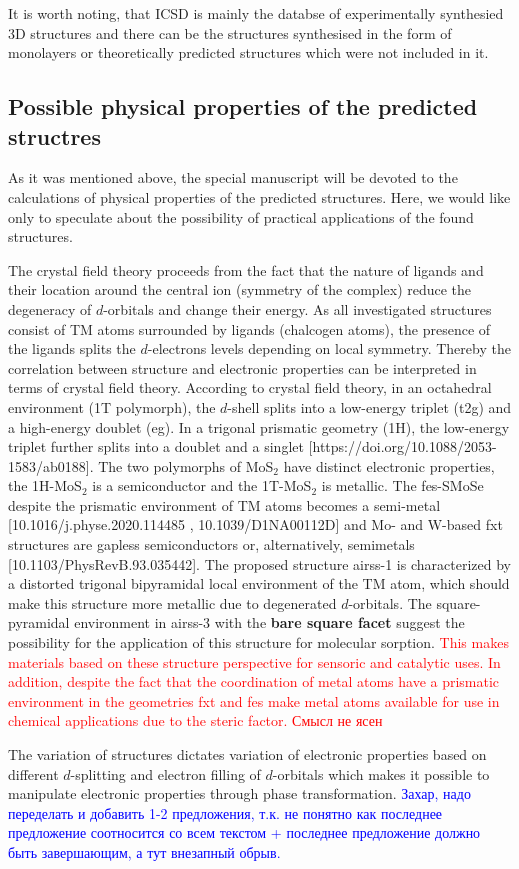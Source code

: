 \documentclass[a4paperm]{article}
\begin{document}
It is worth noting, that ICSD is mainly the databse of experimentally synthesied 3D structures and there can be the structures synthesised in the form of monolayers or theoretically predicted structures which were not included in it.



\subsection{Possible physical properties of the predicted structres}

As it was mentioned above, the special manuscript will be devoted to the calculations of physical properties of the predicted structures.
Here, we would like only to speculate about the possibility of practical applications of the found structures.

The crystal field theory proceeds from the fact that the nature of ligands and their location around the central ion (symmetry of the complex) reduce the degeneracy of $d$-orbitals and change their energy. As all investigated structures consist of TM atoms surrounded by ligands (chalcogen atoms), the presence of the ligands splits the $d$-electrons levels depending on local symmetry. Thereby the correlation between structure and electronic properties can be interpreted in terms of crystal field theory. According to crystal field theory, in an octahedral environment (1T polymorph), the $d$-shell splits into a low-energy triplet (t2g) and a high-energy doublet (eg). In a trigonal prismatic geometry (1H), the low-energy triplet further splits into a doublet and a singlet [https://doi.org/10.1088/2053-1583/ab0188]. The two polymorphs of MoS$_2$ have distinct electronic properties, the 1H-MoS$_2$ is a semiconductor and the 1T-MoS$_2$ is metallic. The fes-SMoSe despite the prismatic environment of TM atoms becomes a semi-metal [10.1016/j.physe.2020.114485 , 10.1039/D1NA00112D] and Mo- and W-based fxt structures are gapless semiconductors or, alternatively, semimetals [10.1103/PhysRevB.93.035442]. The proposed structure airss-1 is characterized by a distorted trigonal bipyramidal local environment of the TM atom, which should make this structure more metallic due to degenerated $d$-orbitals. The square-pyramidal environment in airss-3 with the {\bf bare square facet} suggest the possibility for the application of this structure for molecular sorption.
\textcolor{red}{This makes materials based on these structure perspective for sensoric and catalytic uses. In addition, despite the fact that the coordination of metal atoms have a prismatic environment in the geometries fxt and fes make metal atoms available for use in chemical applications due to the steric factor. Смысл не ясен}

The variation of structures dictates variation of electronic properties based on different $d$-splitting and electron filling of $d$-orbitals which makes it possible to manipulate electronic properties through phase transformation.
\textcolor{blue}{Захар, надо переделать и добавить 1-2 предложения, т.к. не понятно как последнее предложение соотносится со всем текстом + последнее предложение должно быть завершающим, а тут внезапный обрыв.}




\end{document}

